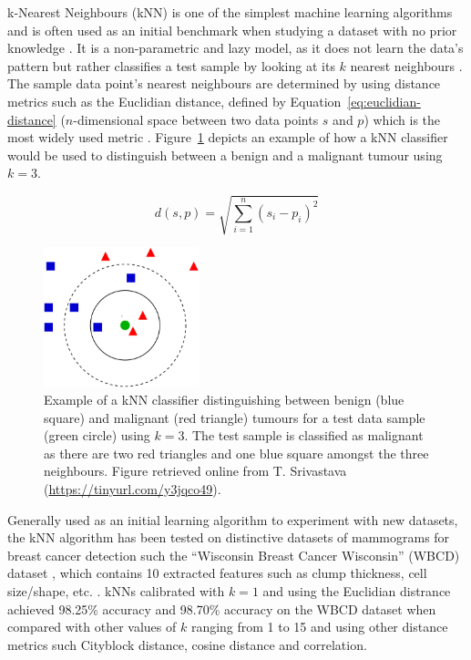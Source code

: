 k-Nearest Neighbours (kNN) is one of the simplest machine learning algorithms and is often used as an initial benchmark when studying a dataset with no prior knowledge \citep{peterson2009k}. It is a non-parametric and lazy model, as it does not learn the data's pattern but rather classifies a test sample by looking at its $k$ nearest neighbours \citep{Yue2018}. The sample data point's nearest neighbours are determined by using distance metrics such as the Euclidian distance, defined by Equation~\ref{eq:euclidian-distance} ($n$-dimensional space between two data points $s$ and $p$) which is the most widely used metric \citep{peterson2009k}. Figure~\ref{fig:litsurvey-knn-example} depicts an example of how a kNN classifier would be used to distinguish between a benign and a malignant tumour using $k=3$.

\begin{equation}
\label{eq:euclidian-distance}
    d(s,p)=\sqrt{\sum_{i=1}^{n}(s_i-p_i)^2}
\end{equation}

\begin{figure}[h]
\centerline{\includegraphics[width=0.4\textwidth]{Dissertation/figures/litsurvey/knn.png}}
\caption{\label{fig:litsurvey-knn-example}Example of a kNN classifier distinguishing between benign (blue square) and malignant (red triangle) tumours for a test data sample (green circle) using $k=3$. The test sample is classified as malignant as there are two red triangles and one blue square amongst the three neighbours. Figure retrieved online from T. Srivastava (\url{https://tinyurl.com/y3jqco49}).}
\end{figure}

Generally used as an initial learning algorithm to experiment with new datasets, the kNN algorithm has been tested on distinctive datasets of mammograms for breast cancer detection such the ``Wisconsin Breast Cancer Wisconsin'' (WBCD) dataset \citep{Wolberg1995}, which contains 10 extracted features such as clump thickness, cell size/shape, etc. \citep{Wolberg1995}. kNNs calibrated with $k=1$ and using the Euclidian distrance achieved 98.25\% accuracy \citep{Sarkar2000} and 98.70\% accuracy \citep{AhmedMedjahed2013} on the WBCD dataset when compared with other values of $k$ ranging from 1 to 15 and using other distance metrics such Cityblock distance, cosine distance and correlation.\\

